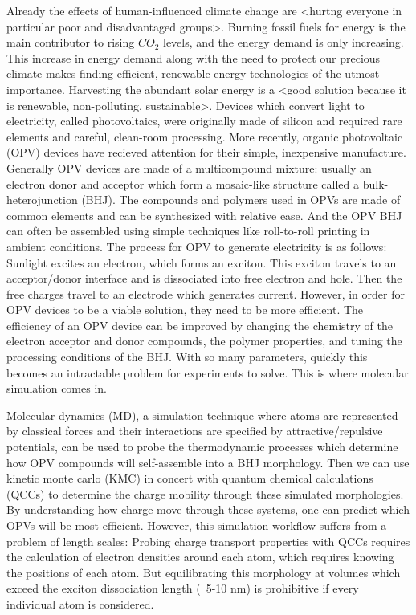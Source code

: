 Already the effects of human-influenced climate change are <hurtng everyone in particular poor and disadvantaged groups>.
Burning fossil fuels for energy is the main contributor to rising $CO_{2}$ levels, and the energy demand is only increasing.
This increase in energy demand along with the need to protect our precious climate makes finding efficient, renewable energy technologies of the utmost importance.
Harvesting the abundant solar energy is a <good solution because it is renewable, non-polluting, sustainable>.
Devices which convert light to electricity, called photovoltaics, were originally made of silicon and required rare elements and careful, clean-room processing.
More recently, organic photovoltaic (OPV) devices have recieved attention for their simple, inexpensive manufacture.
Generally OPV devices are made of a multicompound mixture: usually an electron donor and acceptor which form a mosaic-like structure called a bulk-heterojunction (BHJ).
The compounds and polymers used in OPVs are made of common elements and can be synthesized with relative ease.
And the OPV BHJ can often be assembled using simple techniques like roll-to-roll printing in ambient conditions.
The process for OPV to generate electricity is as follows: 
Sunlight excites an electron, which forms an exciton.
This exciton travels to an acceptor/donor interface and is dissociated into free electron and hole.
Then the free charges travel to an electrode which generates current.
However, in order for OPV devices to be a viable solution, they need to be more efficient.
The efficiency of an OPV device can be improved by changing the chemistry of the electron acceptor and donor compounds, the polymer properties, and tuning the processing conditions of the BHJ.
With so many parameters, quickly this becomes an intractable problem for experiments to solve.
This is where molecular simulation comes in.

Molecular dynamics (MD), a simulation technique where atoms are represented by classical forces and their interactions are specified by attractive/repulsive potentials, can be used to probe the thermodynamic processes which determine how OPV compounds will self-assemble into a BHJ morphology.
Then we can use kinetic monte carlo (KMC) in concert with quantum chemical calculations (QCCs) to determine the charge mobility through these simulated morphologies.
By understanding how charge move through these systems, one can predict which OPVs will be most efficient.
However, this simulation workflow suffers from a problem of length scales:
Probing charge transport properties with QCCs requires the calculation of electron densities around each atom, which requires knowing the positions of each atom.
But equilibrating this morphology at volumes which exceed the exciton dissociation length (~5-10 nm) is prohibitive if every individual atom is considered.

